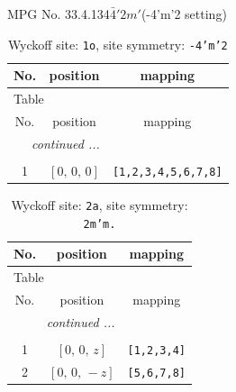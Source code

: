 \documentclass[fleqn,8pt]{jsarticle}
\begin{document}
\setcounter{MaxMatrixCols}{32}

\renewcommand{\tablename}{Table~}
\renewcommand{\figurename}{Figure~}
\begin{center}
\LARGE
MPG No. 33.4.134\quad$\bar{4}'2m'$\quad(-4'm'2 setting)
\end{center}
\renewcommand{\arraystretch}{1.2}
\begin{longtable}{ccc}
\caption{Wyckoff site: {\tt 1o}, site symmetry: {\tt -4'm'2}}
 \\
 \hline \hline
No. & position & mapping \\ \hline \endfirsthead

\multicolumn{2}{l}{\tablename\ \thetable{}} \\
 \hline \hline
No. & position & mapping \\ \hline \endhead

 \hline \hline
\multicolumn{2}{r}{\footnotesize\it continued ...} \\ \endfoot

 \hline \hline
\multicolumn{2}{r}{} \\ \endlastfoot

1 & $\left[ 0,\, 0,\, 0 \right]$ & {\tt [1,2,3,4,5,6,7,8]} \\
\end{longtable}
\renewcommand{\arraystretch}{1.2}
\begin{longtable}{ccc}
\caption{Wyckoff site: {\tt 2a}, site symmetry: {\tt 2m'm.}}
 \\
 \hline \hline
No. & position & mapping \\ \hline \endfirsthead

\multicolumn{2}{l}{\tablename\ \thetable{}} \\
 \hline \hline
No. & position & mapping \\ \hline \endhead

 \hline \hline
\multicolumn{2}{r}{\footnotesize\it continued ...} \\ \endfoot

 \hline \hline
\multicolumn{2}{r}{} \\ \endlastfoot

1 & $\left[ 0,\, 0,\, z \right]$ & {\tt [1,2,3,4]} \\ \hline
2 & $\left[ 0,\, 0,\, - z \right]$ & {\tt [5,6,7,8]} \\
\end{longtable}
\renewcommand{\arraystretch}{1.2}
\end{document}
